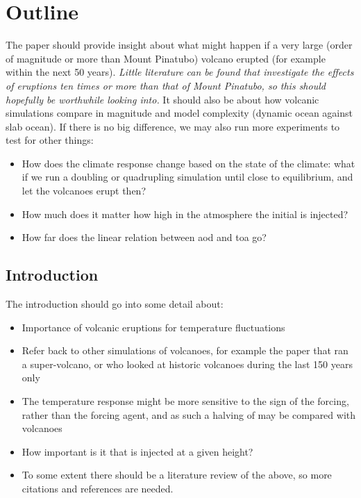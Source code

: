 \documentclass{ametsocV5}
\begin{document}
\section{Outline}

The paper should provide insight about what might happen if a very large (order of
magnitude or more than Mount Pinatubo) volcano erupted (for example within the next 50
years). \emph{Little literature can be found that investigate the effects of eruptions
  ten times or more than that of Mount Pinatubo, so this should hopefully be worthwhile
  looking into.} It should also be about how volcanic simulations compare in magnitude
and model complexity (dynamic ocean against slab ocean). If there is no big difference,
we may also run more experiments to test for other things:
\begin{itemize}
  \item How does the climate response change based on the state of the climate: what if we run
        a  doubling or quadrupling simulation until close to equilibrium, and let the
        volcanoes erupt then?
  \item How much does it matter how high in the atmosphere the initial  is injected?
  \item How far does the linear relation between \acrshort{aod} and \acrshort{toa} go?
\end{itemize}

\subsection*{Introduction}

The introduction should go into some detail about:

\begin{itemize}
  \item Importance of volcanic eruptions for temperature fluctuations
  \item Refer back to other simulations of volcanoes, for example the \citet{jones2005} paper
        that ran a super-volcano, or \citet{gregory2016} who looked at historic volcanoes
        during the last 150 years only
  \item The temperature response might be more sensitive to the sign of the forcing, rather
        than the forcing agent, and as such a halving of  may be compared with
        volcanoes \citep{gunther2022}
  \item How important is it that  is injected at a given height?
  \item To some extent there should be a literature review of the above, so more citations and
        references are needed.
\end{itemize}
\end{document}
